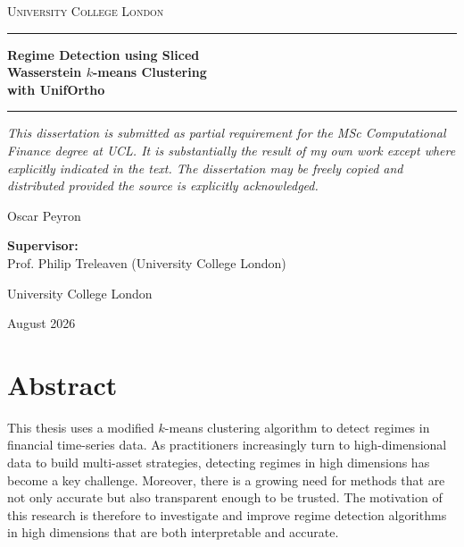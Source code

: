 \documentclass[12pt,a4paper]{report}
\begin{document}
\begin{titlepage}
\centering
\thispagestyle{empty}

{\scshape\large University College London \par}
\vspace{1.5cm}

\rule{\linewidth}{0.4pt}\vspace{0.6cm}

{\huge\bfseries Regime Detection using Sliced\\[0.25em]
Wasserstein $k$-means Clustering\\[0.25em]
with UnifOrtho\par}

\vspace{0.6cm}
\rule{\linewidth}{0.4pt}

\vspace{2cm}
{\large\itshape This dissertation is submitted as partial requirement for the MSc Computational Finance degree at UCL. It is
substantially the result of my own work except where explicitly indicated in the text. The dissertation may be freely copied and distributed provided the source is explicitly
acknowledged.\par}
\vfill

{\Large Oscar Peyron\par}

\vspace{0.8cm} %

{\large\textbf{Supervisor:} \\
Prof. Philip Treleaven (University College London)\\\par}

\vspace{1.5cm} %

{\large University College London \par}
{\large August 2026\par} %
\end{titlepage}

\thispagestyle{empty}
\newpage
\section*{Abstract}
This thesis uses a modified $k$-means clustering algorithm to detect regimes in
financial time-series data. As practitioners increasingly turn to high-dimensional
data to build multi-asset strategies, detecting regimes in high dimensions has
become a key challenge. Moreover, there is a growing need for methods that are not only
accurate but also transparent enough to be trusted. The motivation of this research
is therefore to investigate and improve regime detection algorithms in high dimensions that are both interpretable and accurate.
\end{document}
